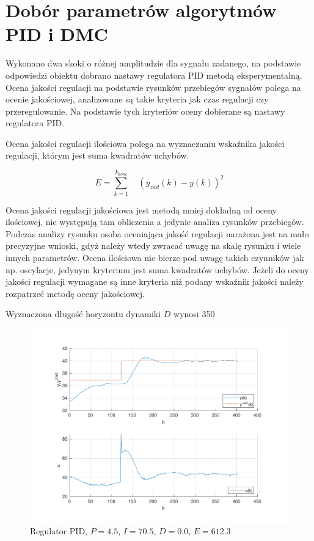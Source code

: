 \section{Dobór parametrów algorytmów PID i DMC}
Wykonano dwa skoki o różnej amplitudzie dla sygnału zadanego, 
na podstawie odpowiedzi obiektu dobrano nastawy regulatora PID metodą eksperymentalną. 
Ocena jakości regulacji na podstawie rysunków przebiegów sygnałów polega na ocenie jakościowej, 
analizowane są takie kryteria jak czas regulacji czy przeregulowanie. 
Na podstawie tych kryteriów oceny dobierane są nastawy regulatora PID.

Ocena jakości regulacji ilościowa polega na wyznaczaniu wskaźnika jakości regulacji, 
którym jest suma kwadratów uchybów. 

$$
E=\sum_{k=1}^{k_{konc}} \quad (y_{zad}(k)-y(k))^{2}
$$

Ocena jakości regulacji jakościowa jest metodą mniej dokładną od oceny ilościowej, 
nie występują tam obliczenia a jedynie analiza rysunków przebiegów. 
Podczas analizy rysunku osoba oceniająca jakość regulacji narażona jest na mało precyzyjne wnioski, 
gdyż należy wtedy zwracać uwagę na skalę rysunku i wiele innych parametrów. 
Ocena ilościowa nie bierze pod uwagę takich czynników jak np. oscylacje, 
jedynym kryterium jest suma kwadratów uchybów. 
Jeżeli do oceny jakości regulacji wymagane są inne kryteria niż podany wskaźnik 
jakości należy rozpatrzeć metodę oceny jakościowej. 

Wyznaczona długość horyzontu dynamiki $D$ wynosi \num{350}

\begin{figure}[H]
    \centering
    \includegraphics[scale=0.75]{../lab/zad_4/zad4pidd1.pdf}
    \caption{Regulator PID, $P=\num{4.5}$, $I=\num{70.5}$, $D=\num{0.0}$, $E=\num{612.3}$}
\end{figure}

